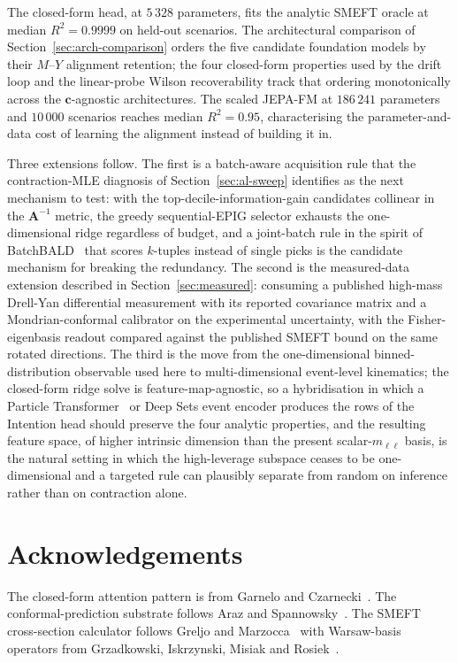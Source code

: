 \documentclass[11pt,a4paper]{article}
\newcommand{\mll}{m_{\ell\ell}}
\begin{document}
The closed-form head, at $5\,328$ parameters, fits the analytic SMEFT oracle at median $R^2 = 0.9999$ on held-out scenarios. The architectural comparison of Section~\ref{sec:arch-comparison} orders the five candidate foundation models by their $M$--$Y$ alignment retention; the four closed-form properties used by the drift loop and the linear-probe Wilson recoverability track that ordering monotonically across the $\bm{c}$-agnostic architectures. The scaled JEPA-FM at $186\,241$ parameters and $10\,000$ scenarios reaches median $R^2 = 0.95$, characterising the parameter-and-data cost of learning the alignment instead of building it in.

Three extensions follow. The first is a batch-aware acquisition rule that the contraction-MLE diagnosis of Section~\ref{sec:al-sweep} identifies as the next mechanism to test: with the top-decile-information-gain candidates collinear in the $\bm{A}^{-1}$ metric, the greedy sequential-EPIG selector exhausts the one-dimensional ridge regardless of budget, and a joint-batch rule in the spirit of BatchBALD~\cite{Kirsch:2019batchbald} that scores $k$-tuples instead of single picks is the candidate mechanism for breaking the redundancy. The second is the measured-data extension described in Section~\ref{sec:measured}: consuming a published high-mass Drell-Yan differential measurement with its reported covariance matrix and a Mondrian-conformal calibrator on the experimental uncertainty, with the Fisher-eigenbasis readout compared against the published SMEFT bound on the same rotated directions. The third is the move from the one-dimensional binned-distribution observable used here to multi-dimensional event-level kinematics; the closed-form ridge solve is feature-map-agnostic, so a hybridisation in which a Particle Transformer~\cite{Qu:2022part} or Deep Sets event encoder produces the rows of the Intention head should preserve the four analytic properties, and the resulting feature space, of higher intrinsic dimension than the present scalar-$\mll$ basis, is the natural setting in which the high-leverage subspace ceases to be one-dimensional and a targeted rule can plausibly separate from random on inference rather than on contraction alone.

\section*{Acknowledgements}

The closed-form attention pattern is from Garnelo and Czarnecki~\cite{Garnelo:2023intention}. The conformal-prediction substrate follows Araz and Spannowsky~\cite{Araz:2025conformal}. The SMEFT cross-section calculator follows Greljo and Marzocca~\cite{Greljo:2017vvb} with Warsaw-basis operators from Grzadkowski, Iskrzynski, Misiak and Rosiek~\cite{Grzadkowski:2010es}.
\end{document}
